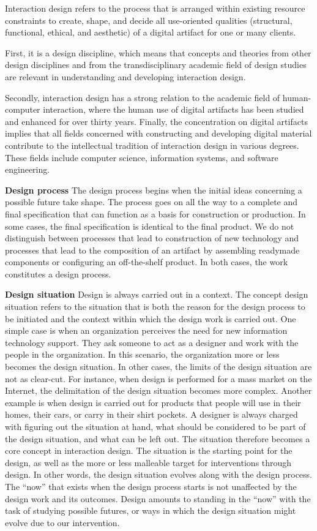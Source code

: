 Interaction design refers to the process that is arranged within existing resource constraints to create, shape, and decide all use-oriented qualities (structural, functional, ethical, and aesthetic) of a digital artifact for one or many clients.

First, it is a design discipline, which means that concepts and theories from other design disciplines and from the transdisciplinary academic field of design studies are relevant in understanding and developing interaction design.

Secondly, interaction design has a strong relation to the academic field of human-computer interaction, where the human use of digital artifacts has been studied and enhanced for over thirty years. Finally, the concentration on digital artifacts implies that all fields concerned with constructing and developing digital material contribute to the intellectual tradition of interaction design in various degrees. These fields include computer science, information systems, and software engineering.

\textbf{Design process}
The design process begins when the initial ideas concerning a possible future take shape. The process goes on all the way to a complete and final specification that can function as a basis for construction or production. In some cases, the final specification is identical to the final product. We do not distinguish between processes that lead to construction of new technology and processes that lead to the composition of an artifact by assembling readymade components or configuring an off-the-shelf product. In both cases, the work constitutes a design process.

\textbf{Design situation}
Design is always carried out in a context. The concept design situation refers to the situation that is both the reason for the design process to be initiated and the context within which the design work is carried out. One simple case is when an organization perceives the need for new information technology support. They ask someone to act as a designer and work with the people in the organization. In this scenario, the organization more or less becomes the design situation. In other cases, the limits of the design situation are not as clear-cut. For instance, when design is performed for a mass market on the Internet, the delimitation of the design situation becomes more complex. Another example is when design is carried out for products that people will use in their homes, their cars, or carry in their shirt pockets. A designer is always charged with figuring out the situation at hand, what should be considered to be part of the design situation, and what can be left out. The situation therefore becomes a core concept in interaction design. The situation is the starting point for the design, as well as the more or less malleable target for interventions through design. In other words, the design situation evolves along with the design process. The “now” that exists when the design process starts is not unaffected by the design work and its outcomes. Design amounts to standing in the “now” with the task of studying possible futures, or ways in which the design situation might evolve due to our intervention.

